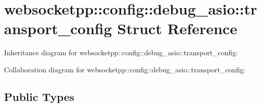 \hypertarget{structwebsocketpp_1_1config_1_1debug__asio_1_1transport__config}{}\section{websocketpp\+:\+:config\+:\+:debug\+\_\+asio\+:\+:transport\+\_\+config Struct Reference}
\label{structwebsocketpp_1_1config_1_1debug__asio_1_1transport__config}


Inheritance diagram for websocketpp\+:\+:config\+:\+:debug\+\_\+asio\+:\+:transport\+\_\+config\+:


Collaboration diagram for websocketpp\+:\+:config\+:\+:debug\+\_\+asio\+:\+:transport\+\_\+config\+:
\subsection*{Public Types}
